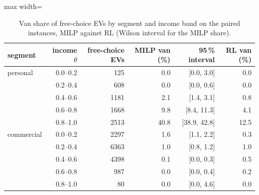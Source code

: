 \begin{table}[H]\centering
\small
\caption{Van share of free-choice EVs by segment and income band on the paired instances, MILP against RL (Wilson interval for the MILP share).}\label{tab:vsm}
\begin{adjustbox}{max width=\textwidth}\begin{tabular}{lrrrrr}\toprule
segment & income $\theta$ & free-choice EVs & MILP van (\%) & 95\,\% interval & RL van (\%) \\ \midrule
personal & 0.0--0.2 & 125 & 0.0 & [0.0, 3.0] & 0.0 \\
 & 0.2--0.4 & 608 & 0.0 & [0.0, 0.6] & 0.0 \\
 & 0.4--0.6 & 1181 & 2.1 & [1.4, 3.1] & 0.8 \\
 & 0.6--0.8 & 1668 & 9.8 & [8.4, 11.3] & 4.1 \\
 & 0.8--1.0 & 2513 & 40.8 & [38.9, 42.8] & 12.5 \\
commercial & 0.0--0.2 & 2297 & 1.6 & [1.1, 2.2] & 0.3 \\
 & 0.2--0.4 & 6363 & 1.0 & [0.8, 1.2] & 1.0 \\
 & 0.4--0.6 & 4398 & 0.1 & [0.0, 0.3] & 0.5 \\
 & 0.6--0.8 & 987 & 0.0 & [0.0, 0.4] & 0.2 \\
 & 0.8--1.0 & 80 & 0.0 & [0.0, 4.6] & 0.0 \\
\bottomrule\end{tabular}\end{adjustbox}\end{table}
